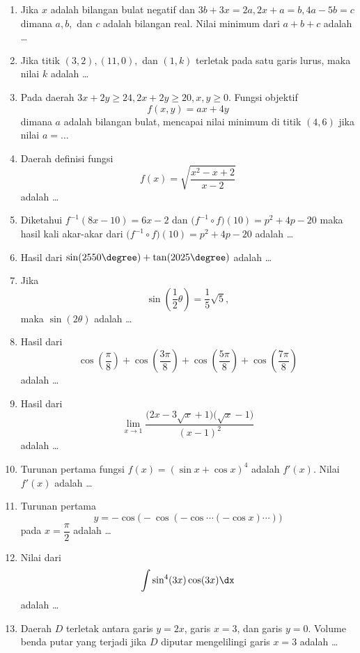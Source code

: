 \begin{enumerate}
\item Jika $x$ adalah bilangan bulat negatif dan $3b+3x = 2a, 2x+a = b, 4a-5b = c$ dimana $a,b,$ dan $c$ adalah bilangan real. Nilai minimum dari $a+b+c$ adalah \ldots

\item Jika titik $(3,2), (11,0),$ dan $(1,k)$ terletak pada satu garis lurus, maka nilai $k$ adalah \ldots

\item Pada daerah $3x+2y \geq 24, 2x+2y\geq 20, x,y\geq 0$. Fungsi objektif \[f(x,y) = ax+4y\] dimana $a$ adalah bilangan bulat, mencapai nilai minimum di titik $(4,6)$ jika nilai $a = \ldots$

\item Daerah definisi fungsi \[f(x) = \sqrt{\frac{x^2-x+2}{x-2}}\] adalah \ldots

\item Diketahui $f^{-1}(8x-10) = 6x-2$ dan $\bigl(f^{-1} \circ f\bigr)(10) = p^2+4p-20$ maka hasil kali akar-akar dari $\bigl(f^{-1} \circ f\bigr)(10) = p^2+4p-20$ adalah \ldots

\item Hasil dari $\sin(2550\degree) + \tan(2025\degree)$ adalah \ldots

\item Jika \[\sin\left(\frac{1}{2}\theta\right) = \frac{1}{5}\sqrt{5},\] maka $\sin(2\theta)$ adalah \ldots

\item Hasil dari \[\cos\left(\frac{\pi}{8}\right) + \cos\left(\frac{3\pi}{8}\right) + \cos\left(\frac{5\pi}{8}\right) + \cos\left(\frac{7\pi}{8}\right)\] adalah \ldots

\item Hasil dari \[\lim_{x\to1}\frac{\bigl(2x-3\sqrt{x}+1\bigr)\bigl(\sqrt{x}-1\bigr)}{(x-1)^2}\] adalah \ldots

\item Turunan pertama fungsi $f(x) = (\sin x + \cos x)^4$ adalah $f'(x)$. Nilai $f'(x)$ adalah \ldots

\item Turunan pertama \[y = -\cos\bigl(-\cos(-\cos\cdots(-\cos x)\cdots)\bigr)\] pada $x = \dfrac{\pi}{2}$ adalah \ldots

\item Nilai dari \[\int \sin^4(3x)\cos(3x) \dx\] adalah \ldots

\item Daerah $D$ terletak antara garis $y=2x$, garis $x=3$, dan garis $y=0$. Volume benda putar yang terjadi jika $D$ diputar mengelilingi garis $x=3$ adalah \ldots


\end{enumerate}
